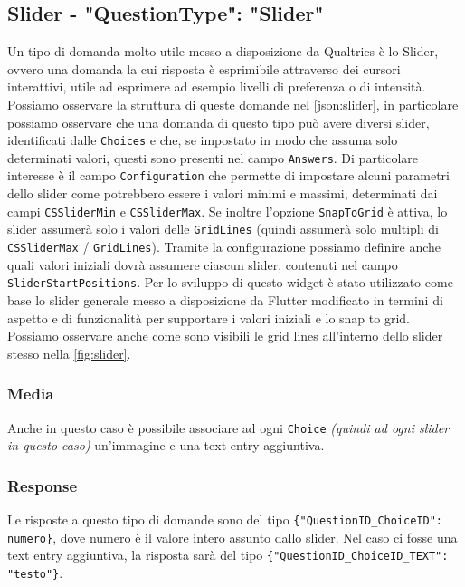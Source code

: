 \clearpage
\subsection{Slider - "QuestionType": "Slider"}
Un tipo di domanda molto utile messo a disposizione da Qualtrics è lo Slider, ovvero una domanda la cui risposta è esprimibile attraverso dei cursori interattivi, utile ad esprimere ad esempio livelli di preferenza o di intensità. Possiamo osservare la struttura di queste domande nel \autoref{json:slider}, in particolare possiamo osservare che una domanda di questo tipo può avere diversi slider, identificati dalle \texttt{Choices} e che, se impostato in modo che assuma solo determinati valori, questi sono presenti nel campo \texttt{Answers}. Di particolare interesse è il campo \texttt{Configuration} che permette di impostare alcuni parametri dello slider come potrebbero essere i valori minimi e massimi, determinati dai campi \texttt{CSSliderMin} e \texttt{CSSliderMax}. Se inoltre l'opzione \texttt{SnapToGrid} è attiva, lo slider assumerà solo i valori delle \texttt{GridLines} (quindi assumerà solo multipli di \texttt{CSSliderMax} / \texttt{GridLines}). Tramite la configurazione possiamo definire anche quali valori iniziali dovrà assumere ciascun slider, contenuti nel campo \texttt{SliderStartPositions}.
Per lo sviluppo di questo widget è stato utilizzato come base lo slider generale messo a disposizione da Flutter modificato in termini di aspetto e di funzionalità per supportare i valori iniziali e lo snap to grid. Possiamo osservare anche come sono visibili le grid lines all'interno dello slider stesso nella \autoref{fig:slider}.

\subsubsection{Media}
Anche in questo caso è possibile associare ad ogni \texttt{Choice} \textit{(quindi ad ogni slider in questo caso)} un'immagine e una text entry aggiuntiva.

\subsubsection{Response}
Le risposte a questo tipo di domande sono del tipo \texttt{\{"QuestionID\_ChoiceID": numero\}}, dove numero è il valore intero assunto dallo slider. Nel caso ci fosse una text entry aggiuntiva, la risposta sarà del tipo \texttt{\{"QuestionID\_ChoiceID\_TEXT": "testo"\}}.

